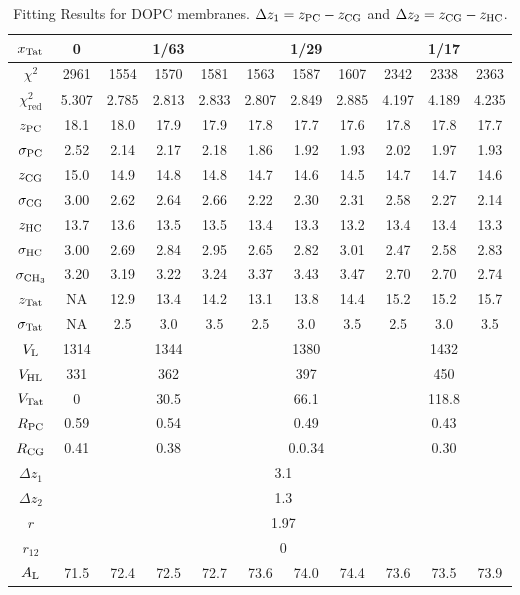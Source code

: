 \begin{table}[htbp]
  \centering
  \begin{tabular}{|c|c|c|c|c|c|c|c|c|c|c|}
    \hline
    $x_\textrm{Tat}$ & 0 & \multicolumn{3}{c|}{1/63} & \multicolumn{3}{c|}{1/29} & \multicolumn{3}{c|}{1/17} \\
    \hline
    $\chi^2$ & 2961 & 1554 & 1570 & 1581 & 1563 & 1587 & 1607 & 2342 & 2338 & 2363 \\ 
    $\chi^2_\textrm{red}$ & 5.307 & 2.785 & 2.813 & 2.833 & 2.807 & 2.849 & 2.885 & 4.197 & 4.189 & 4.235 \\
    \hline
    $z_\textrm{PC}$ & 18.1 & 18.0 & 17.9 & 17.9 & 17.8 & 17.7 & 17.6 & 17.8 & 17.8 & 17.7 \\
    $\sigma_\textrm{PC}$ & 2.52 & 2.14 & 2.17 & 2.18 & 1.86 & 1.92 & 1.93 & 2.02 & 1.97 & 1.93 \\
    $z_\textrm{CG}$ & 15.0 & 14.9 & 14.8 & 14.8 & 14.7 & 14.6 & 14.5 & 14.7 & 14.7 & 14.6 \\
    $\sigma_\textrm{CG}$ & 3.00 & 2.62 & 2.64 & 2.66 & 2.22 & 2.30 & 2.31 & 2.58 & 2.27 & 2.14 \\
    $z_\textrm{HC}$ & 13.7 & 13.6 & 13.5 & 13.5 & 13.4 & 13.3 & 13.2 & 13.4 & 13.4 & 13.3 \\ 
    $\sigma_\textrm{HC}$ & 3.00 & 2.69 & 2.84 & 2.95 & 2.65 & 2.82 & 3.01 & 2.47 & 2.58 & 2.83 \\
    $\sigma_{\textrm{CH}_3}$ & 3.20 & 3.19 & 3.22 & 3.24 & 3.37 & 3.43 & 3.47 & 2.70 & 2.70 & 2.74 \\
    $z_\textrm{Tat}$ & NA & 12.9 & 13.4 & 14.2 & 13.1 & 13.8 & 14.4 & 15.2 & 15.2 & 15.7 \\
    $\sigma_\textrm{Tat}$ & NA & 2.5 & 3.0 & 3.5 & 2.5 & 3.0 & 3.5 & 2.5 & 3.0 & 3.5 \\ 
    \hline
    $V_\textrm{L}$ & 1314 & \multicolumn{3}{c|}{1344} & \multicolumn{3}{c|}{1380} & \multicolumn{3}{c|}{1432} \\ 
    $V_\textrm{HL}$ & 331 & \multicolumn{3}{c|}{362} & \multicolumn{3}{c|}{397} & \multicolumn{3}{c|}{450} \\
    $V_\textrm{Tat}$ & 0 & \multicolumn{3}{c|}{30.5} & \multicolumn{3}{c|}{66.1} & \multicolumn{3}{c|}{118.8} \\
    $R_\textrm{PC}$ & 0.59 & \multicolumn{3}{c|}{0.54} & \multicolumn{3}{c|}{0.49} & \multicolumn{3}{c|}{0.43} \\
    $R_\textrm{CG}$ & 0.41 & \multicolumn{3}{c|}{0.38} & \multicolumn{3}{c|}{0.0.34} & \multicolumn{3}{c|}{0.30} \\
    \hline
    $\Delta z_1$ & \multicolumn{10}{c|}{3.1} \\
    $\Delta z_2$ & \multicolumn{10}{c|}{1.3} \\
    $r$ & \multicolumn{10}{c|}{1.97} \\
    $r_{12}$ & \multicolumn{10}{c|}{0} \\
    \hline
    $A_\textrm{L}$ & 71.5 & 72.4 & 72.5 & 72.7 & 73.6 & 74.0 & 74.4 & 73.6 & 73.5 & 73.9 \\
    \hline
  \end{tabular}
  \caption{Fitting Results for DOPC membranes. $\Delta z_1 = z_\textrm{PC}-z_\textrm{CG}$
  and $\Delta z_2 = z_\textrm{CG}-z_\textrm{HC}$.}
  \label{tb:DOPC_fit_results}
\end{table}
